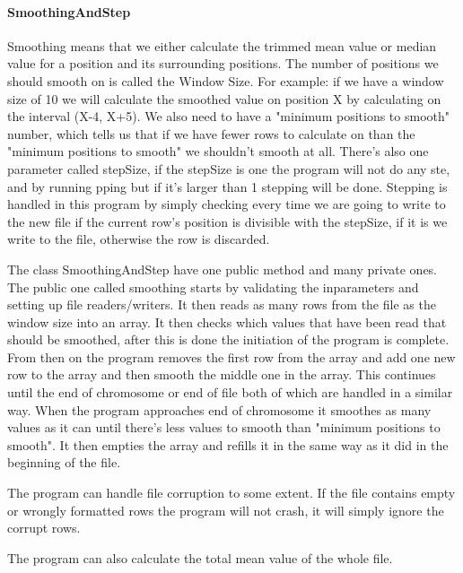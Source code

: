 \paragraph{SmoothingAndStep}
Smoothing means that we either calculate the trimmed mean value or median value for a position and its surrounding positions. The number of positions we should smooth on is called the Window Size. For example: if we have a window size of 10 we will calculate the smoothed value on position X by calculating on the interval (X-4, X+5). We also need to have a "minimum positions to smooth" number, which tells us that if we have fewer rows to calculate on than the "minimum positions to smooth" we shouldn't smooth at all. There's also one parameter called stepSize, if the stepSize is one the program will not do any ste,  and by running
pping but if it's larger than 1 stepping will be done. Stepping is handled in this program by simply checking every time we are going to write to the new file if the current row's position is divisible with the stepSize, if it is we write to the file, otherwise the row is discarded.

The class SmoothingAndStep have one public method and many private ones. The public one called smoothing starts by validating the inparameters and setting up file readers/writers. It then reads as many rows from the file as the window size into an array. It then checks which values that have been read that should be smoothed, after this is done the initiation of the program is complete. From then on the program removes the first row from the array and add one new row to the array and then smooth the middle one in the array. This continues until the end of chromosome or end of file both of which are handled in a similar way. When the program approaches end of chromosome it smoothes as many values as it can until there's less values to smooth than "minimum positions to smooth". It then empties the array and refills it in the same way as it did in the beginning of the file.

The program can handle file corruption to some extent. If the file contains empty or wrongly formatted rows the program will not crash, it will simply ignore the corrupt rows.

The program can also calculate the total mean value of the whole file.



